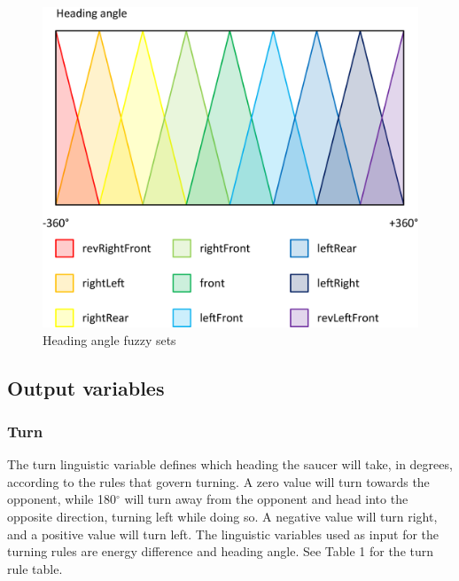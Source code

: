 \begin{figure}[H]
\centering
\caption{Heading angle fuzzy sets}
\includegraphics[scale=0.1]{./img/pdf/headingAngleSets.pdf}
\end{figure}

\subsection{Output variables}

\subsubsection{Turn}

The turn linguistic variable defines which heading the saucer will take, in degrees, according to the rules that govern turning. A zero value will turn towards the opponent, while 180$^{\circ}$ will turn away from the opponent and head into the opposite direction, turning left while doing so. A negative value will turn right, and a positive value will turn left. The linguistic variables used as input for the turning rules are energy difference and heading angle. See Table 1 for the turn rule table.

